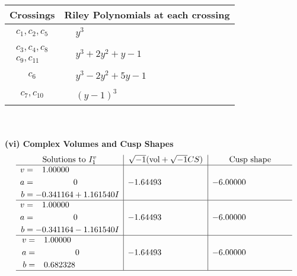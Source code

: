 \documentclass[1p]{elsarticle_modified}
\theoremstyle{definition}
\newcommand{\I}{\sqrt{-1}}
\begin{document}
\begin{tabular}{m{50pt}|m{274pt}}
Crossings & \hspace{64pt}Riley Polynomials at each crossing \\
\hline $$\begin{aligned}c_{1},c_{2},c_{5}\end{aligned}$$&$\begin{aligned}
&y^3
\end{aligned}$\\
\hline $$\begin{aligned}c_{3},c_{4},c_{8}\\c_{9},c_{11}\end{aligned}$$&$\begin{aligned}
&y^3+2 y^2+y-1
\end{aligned}$\\
\hline $$\begin{aligned}c_{6}\end{aligned}$$&$\begin{aligned}
&y^3-2 y^2+5 y-1
\end{aligned}$\\
\hline $$\begin{aligned}c_{7},c_{10}\end{aligned}$$&$\begin{aligned}
&(y-1)^3
\end{aligned}$\\
\hline
\end{tabular}\\~\\
\newpage\flushleft \textbf{(vi) Complex Volumes and Cusp Shapes}
$$\begin{array}{c|c|c}  
\text{Solutions to }I^v_{1}& \I (\text{vol} + \sqrt{-1}CS) & \text{Cusp shape}\\
 \hline 
\begin{aligned}
v &= \phantom{-}1.00000\phantom{ +0.000000I} \\
a &= \phantom{-0.000000 } 0 \\
b &= -0.341164 + 1.161540 I\end{aligned}
 & -1.64493\phantom{ +0.000000I} & -6.00000\phantom{ +0.000000I} \\ \hline\begin{aligned}
v &= \phantom{-}1.00000\phantom{ +0.000000I} \\
a &= \phantom{-0.000000 } 0 \\
b &= -0.341164 - 1.161540 I\end{aligned}
 & -1.64493\phantom{ +0.000000I} & -6.00000\phantom{ +0.000000I} \\ \hline\begin{aligned}
v &= \phantom{-}1.00000\phantom{ +0.000000I} \\
a &= \phantom{-0.000000 } 0 \\
b &= \phantom{-}0.682328\phantom{ +0.000000I}\end{aligned}
 & -1.64493\phantom{ +0.000000I} & -6.00000\phantom{ +0.000000I}\\
 \hline 
 \end{array}$$\newpage
\end{document}

